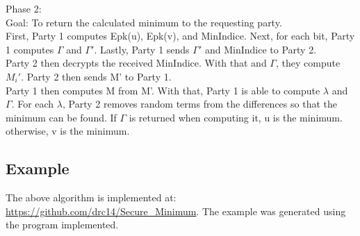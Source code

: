 \documentclass[10pt]{article} %
\begin{document}
Phase 2:\\
	Goal:
    To return the calculated minimum to the requesting party.\\
	
    First, Party 1 computes Epk(u), Epk(v), and MinIndice.
    Next, for each bit, Party 1 computes $\Gamma$ and $\Gamma'$.
    Lastly, Party 1 sends $\Gamma'$ and MinIndice to Party 2.\\

	Party 2 then decrypts the received MinIndice.
    With that and $\Gamma$, they compute $M_i'$.
    Party 2 then sends M' to Party 1.\\
    
    Party 1 then computes M from M'.
    With that, Party 1 is able to compute $\lambda$ and $\Gamma$.
    For each $\lambda$, Party 2 removes random terms from the differences so that the minimum can be found.
    If $\Gamma$ is returned when computing it, u is the minimum. otherwise, v is the minimum.\\
    






\subsection*{\textbf{Example}}
The above algorithm is implemented at: \url{https://github.com/drc14/Secure_Minimum}. The example was generated using the program implemented.
\end{document}
